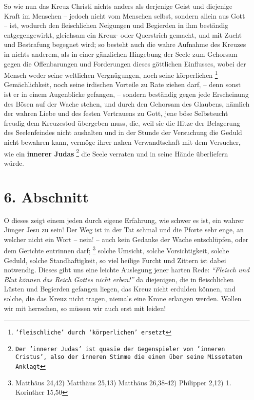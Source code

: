 \medskip

So wie nun das Kreuz Christi nichts anders als derjenige Geist und diejenige
Kraft im Menschen -- jedoch nicht vom Menschen selbst, sondern allein aus Gott --
ist, wodurch den fleischlichen Neigungen und Begierden in ihm beständig
entgegengewirkt, gleichsam ein Kreuz- oder Querstrich gemacht, und mit Zucht und
Bestrafung begegnet wird; so besteht auch die wahre Aufnahme des Kreuzes in
nichts anderem, als in einer gänzlichen Hingebung der Seele zum Gehorsam gegen
die Offenbarungen und Forderungen dieses göttlichen Einflusses, wobei der Mensch
weder seine weltlichen Vergnügungen, noch seine körperlichen \footnote{\texttt{'fleischliche' durch 'körperlichen' ersetzt}} Gemächlichkeit,
noch seine irdischen Vorteile zu Rate ziehen darf, -- denn sonst ist er in
einem Augenblicke gefangen, -- sondern beständig gegen jede Erscheinung des
Bösen auf der Wache stehen, und durch den Gehorsam des Glaubens, nämlich der
wahren Liebe und des festen Vertrauens zu Gott, jene böse Selbstsucht freudig
dem Kreuzestod übergeben muss, die, weil sie die Hitze der Belagerung des
Seelenfeindes nicht aushalten und in der Stunde der Versuchung die Geduld nicht
bewahren kann, vermöge ihrer nahen Verwandtschaft mit dem Versucher, wie ein
\textbf{innerer Judas}
\footnote{\texttt{Der 'innerer Judas' ist quasie der Gegenspieler von 'inneren Cristus', also der inneren Stimme die einen über seine Missetaten Anklagt}} 
die Seele verraten und in seine Hände überliefern würde.



\section{6. Abschnitt} \label{kap3_ab6}

O dieses zeigt einem jeden durch eigene Erfahrung, wie schwer es ist, ein wahrer
Jünger Jesu zu sein! Der Weg ist in der Tat schmal und die Pforte sehr enge, an
welcher nicht ein Wort -- nein! -- auch kein Gedanke der Wache entschlüpfen, oder
dem Gerichte entrinnen darf;
\footnote{Matthäus 24,42) Matthäus 25,13) Matthäus 26,38-42)
Philipper 2,12) 1. Korinther 15,50}
solche Umsicht, solche Vorsichtigkeit, solche Geduld,
solche Standhaftigkeit, so viel heilige Furcht und Zittern ist dabei notwendig.
Dieses gibt uns eine leichte Auslegung jener harten Rede:
\textit{"`Fleisch und Blut können das Reich Gottes nicht erben!"'}
da diejenigen, die in fleischlichen
Lüsten und Begierden gefangen liegen, das Kreuz nicht erdulden können, und
solche, die das Kreuz nicht tragen, niemals eine Krone erlangen werden. Wollen
wir mit herrschen, so müssen wir auch erst mit leiden!


